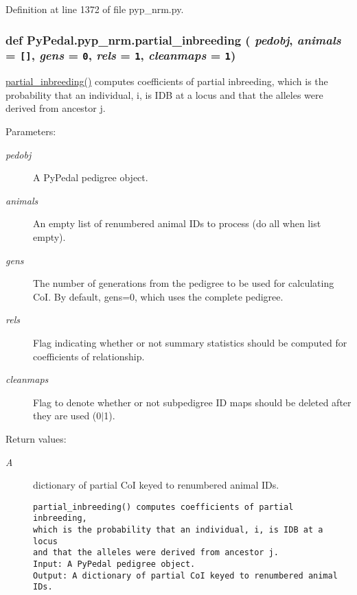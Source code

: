 Definition at line 1372 of file pyp\_\-nrm.py.\hypertarget{namespacePyPedal_1_1pyp__nrm_271ba7166235340580cfe58aa31c887d}{
\subsubsection[partial\_\-inbreeding]{\setlength{\rightskip}{0pt plus 5cm}def Py\-Pedal.pyp\_\-nrm.partial\_\-inbreeding ( {\em pedobj},  {\em animals} = {\tt \mbox{[}\mbox{]}},  {\em gens} = {\tt 0},  {\em rels} = {\tt 1},  {\em cleanmaps} = {\tt 1})}}
\label{namespacePyPedal_1_1pyp__nrm_271ba7166235340580cfe58aa31c887d}


\hyperlink{namespacePyPedal_1_1pyp__nrm_271ba7166235340580cfe58aa31c887d}{partial\_\-inbreeding()} computes coefficients of partial inbreeding, which is the probability that an individual, i, is IDB at a locus and that the alleles were derived from ancestor j. 

\begin{Desc}
\item[Parameters:]
\begin{description}
\item[{\em pedobj}]A Py\-Pedal pedigree object. \item[{\em animals}]An empty list of renumbered animal IDs to process (do all when list empty). \item[{\em gens}]The number of generations from the pedigree to be used for calculating Co\-I. By default, gens=0, which uses the complete pedigree. \item[{\em rels}]Flag indicating whether or not summary statistics should be computed for coefficients of relationship. \item[{\em cleanmaps}]Flag to denote whether or not subpedigree ID maps should be deleted after they are used (0$|$1). \end{description}
\end{Desc}
\begin{Desc}
\item[Return values:]
\begin{description}
\item[{\em A}]dictionary of partial Co\-I keyed to renumbered animal IDs.

\footnotesize\begin{verbatim}partial_inbreeding() computes coefficients of partial inbreeding,
which is the probability that an individual, i, is IDB at a locus
and that the alleles were derived from ancestor j.
Input: A PyPedal pedigree object.
Output: A dictionary of partial CoI keyed to renumbered animal IDs.
\end{verbatim}
\normalsize
 \end{description}
\end{Desc}


